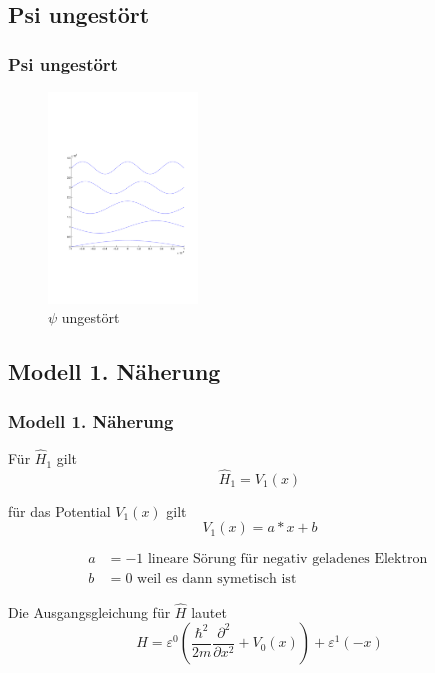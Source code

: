 \documentclass[aspectratio=169]{beamer}
\begin{document}
\subsection{ Psi ungest\"ort }
\begin{frame}
  \frametitle{ Psi ungest\"ort }
  \begin{figure}
    \centering
    \includegraphics[height=5.6cm,clip=true,trim=2cm 7cm 1cm 8cm]{../../skript/efeld/Psi_ungestoert.pdf}
    \caption{$\psi$ ungest\"ort}
  \end{figure}

\end{frame}

\subsection{ Modell 1. N\"aherung }
\begin{frame} 
  \frametitle{ Modell 1. N\"aherung }

  F\"ur $\hat H_1$ gilt
  \[
    \hat H_1 =  V_1(x)
  \]

  f\"ur das Potential $V_1(x)$ gilt
  \[
    V_1(x) = a*x +b 
  \]
  
  \begin{align*}
    a &= -1 \text{ lineare S\"orung f\"ur negativ geladenes Elektron }
  \\
    b &= 0 \text{ weil es dann symetisch ist }
  \end{align*}

  Die Ausgangsgleichung f\"ur $\hat{H}$ lautet
  \[
    \hat{H} = \varepsilon^0 ( \frac{\hbar^2}{2m} \frac{\partial^2}{\partial x^2} + V_0(x) )
               + \varepsilon^1 (  - x )
  \]
\end{frame}
\end{document}
